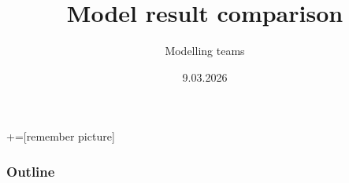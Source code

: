 \documentclass{beamer} %
\title[]{Model result comparison}
\author{Modelling teams}
\date{9.03.2026}
\institute{CROSS}
\begin{document}
+=[remember picture]


\titlepage

\begin{frame}
\frametitle{Outline}
\tableofcontents[sections={1-5}]
\end{frame}







%

\end{document}
